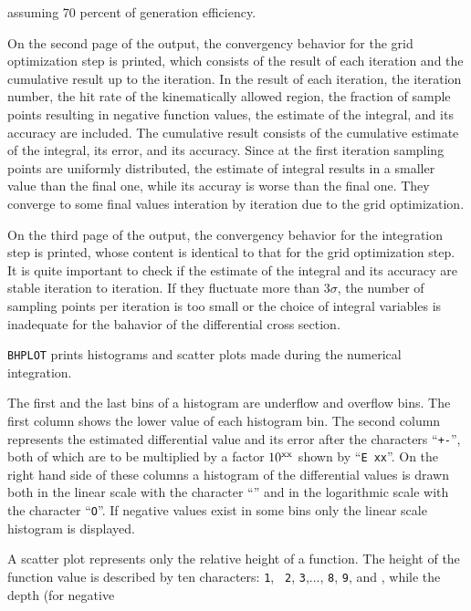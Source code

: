 assuming 70 percent of generation efficiency.
\par
On the second page of the output, the convergency behavior for the grid
optimization step is printed, which consists of the result of each iteration
and the cumulative result up to the iteration. In the result of each
iteration, the iteration number, the hit rate of the kinematically allowed
region, the fraction of sample points resulting in negative function values,
 the estimate of the integral, and its accuracy are included. 
The cumulative result consists of the cumulative estimate of the integral, its
error, and its accuracy. Since at the first iteration  sampling points are
uniformly distributed, the estimate of integral results in a smaller value than
the final one, while  its accuray is worse than the final one.   
They converge to some
final values interation by iteration due to the grid optimization.
\par 
On the third page of the output, the convergency behavior for the
integration step is printed, whose content is identical to that for
the grid optimization step. 
It is quite important to check if the estimate of the 
integral and its accuracy are stable iteration to
iteration.  If they fluctuate more than $3\sigma$, the number
of sampling points per iteration is too small or the choice of integral variables
is inadequate for the bahavior of the differential cross section.
\par\smallskip
{}
\par\noindent
{\tt BHPLOT} prints histograms and scatter plots made during the numerical
integration.
\par
The first and the last bins of a histogram are underflow and
overflow bins. The first column shows the lower value of each histogram bin.
The second column represents  the estimated differential value and its
error after the characters ``{\tt +-}'', both of which are to be multiplied by a
factor $10^{\rm xx}$ shown by ``{\tt E xx}''.
On the right hand side of these columns a histogram of the differential values
is drawn both in the linear scale with the character ``{\tt *}'' and in the
logarithmic scale with the character ``{\tt O}''.
If negative values exist in some bins only the linear scale histogram is
displayed.
\par
A scatter plot represents only the relative height of a function.
The height of the function value is described by ten characters: {\tt 1}, {\tt 
2}, {\tt 3},..., {\tt 8}, {\tt 9}, and {\tt *}, while the depth (for negative
